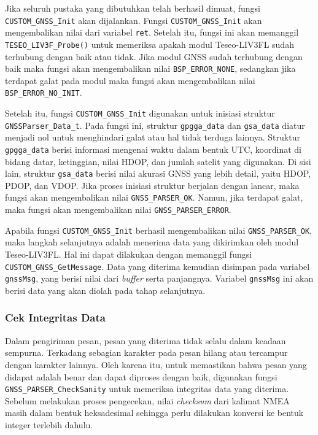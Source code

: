 Jika seluruh pustaka yang dibutuhkan telah berhasil dimuat, fungsi \texttt{CUSTOM\_GNSS\_Init} akan dijalankan. Fungsi \texttt{CUSTOM\_GNSS\_Init} akan mengembalikan nilai dari variabel \texttt{ret}. Setelah itu, fungsi ini akan memanggil \texttt{TESEO\_LIV3F\_Probe()} untuk memeriksa apakah modul Teseo-LIV3FL sudah terhubung dengan baik atau tidak. Jika modul GNSS sudah terhubung dengan baik maka fungsi akan mengembalikan nilai \texttt{BSP\_ERROR\_NONE}, sedangkan jika terdapat galat pada modul maka fungsi akan mengembalikan nilai \texttt{BSP\_ERROR\_NO\_INIT}.

Setelah itu, fungsi \texttt{CUSTOM\_GNSS\_Init} digunakan untuk inisiasi struktur \texttt{GNSSParser\_Data\_t}. Pada fungsi ini, struktur \texttt{gpgga\_data} dan \texttt{gsa\_data} diatur menjadi nol untuk menghindari galat atau hal tidak terduga lainnya. Struktur \texttt{gpgga\_data} berisi informasi mengenai waktu dalam bentuk UTC, koordinat di bidang datar, ketinggian, nilai HDOP, dan jumlah satelit yang digunakan. Di sisi lain, struktur \texttt{gsa\_data} berisi nilai akurasi GNSS yang lebih detail, yaitu HDOP, PDOP, dan VDOP. Jika proses inisiasi struktur berjalan dengan lancar, maka fungsi akan mengembalikan nilai \texttt{GNSS\_PARSER\_OK}. Namun, jika terdapat galat, maka fungsi akan mengembalikan nilai \texttt{GNSS\_PARSER\_ERROR}.

Apabila fungsi \texttt{CUSTOM\_GNSS\_Init} berhasil mengembalikan nilai \texttt{GNSS\_PARSER\_OK}, maka langkah selanjutnya adalah menerima data yang dikirimkan oleh modul Teseo-LIV3FL. Hal ini dapat dilakukan dengan memanggil fungsi \texttt{CUSTOM\_GNSS\_GetMessage}. Data yang diterima kemudian disimpan pada variabel \texttt{gnssMsg}, yang berisi nilai dari \textit{buffer} serta panjangnya. Variabel \texttt{gnssMsg} ini akan berisi data yang akan diolah pada tahap selanjutnya.

\subsubsection{Cek Integritas Data}
Dalam pengiriman pesan, pesan yang diterima tidak selalu dalam keadaan sempurna. Terkadang sebagian karakter pada pesan hilang atau tercampur dengan karakter lainnya. Oleh karena itu, untuk memastikan bahwa pesan yang didapat adalah benar dan dapat diproses dengan baik, digunakan fungsi \texttt{GNSS\_PARSER\_CheckSanity} untuk memeriksa integritas data yang diterima. Sebelum melakukan proses pengecekan, nilai \textit{checksum} dari kalimat NMEA masih dalam bentuk heksadesimal sehingga perlu dilakukan konversi ke bentuk integer terlebih dahulu.

